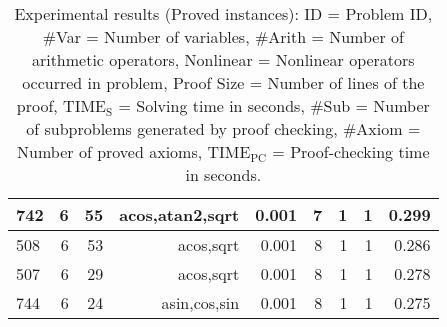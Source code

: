 \begin{table}[b!h!]
\begin{center}
\begin{tabular}{|l||r|r|r||r|r|r|r|r|}
\hline
742 & 6 & 55 & acos,atan2,sqrt & 0.001 & 7 & 1 & 1 & 0.299 \\
\hline
508 & 6 & 53 & acos,sqrt & 0.001 & 8 & 1 & 1 & 0.286 \\
\hline
507 & 6 & 29 & acos,sqrt & 0.001 & 8 & 1 & 1 & 0.278 \\
\hline
744 & 6 & 24 & asin,cos,sin & 0.001 & 8 & 1 & 1 & 0.275\\
\hline
\end{tabular}
  \end{center}
  \caption{
    Experimental results (Proved instances):
    ID = Problem ID,
    \#Var = Number of variables,
    \#Arith = Number of arithmetic operators,
    Nonlinear = Nonlinear operators occurred in problem,
    Proof Size = Number of lines of the proof,
    $\mathrm{TIME_S}$ = Solving time in seconds,
    \#Sub = Number of subproblems generated by proof checking,
    \#Axiom = Number of proved axioms,
    $\mathrm{TIME_{PC}}$ = Proof-checking time in seconds.
  }\label{tbl:exp}
  \vspace{-1cm}
\end{table}

